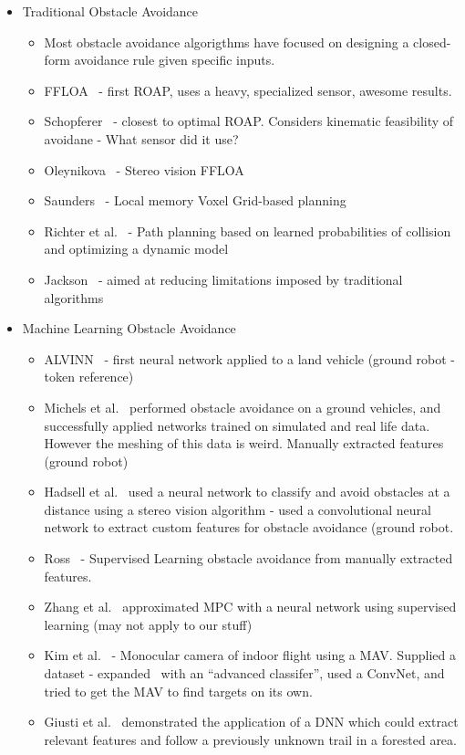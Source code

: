 \documentclass[paper=a4, fontsize=11pt]{scrartcl} %
\begin{document}
		\begin{itemize}
			\item Traditional Obstacle Avoidance
			\begin{itemize}
				\item Most obstacle avoidance algorigthms have focused on designing a closed-form avoidance rule given specific inputs.
				\item FFLOA~\cite{Scherer2007} - first ROAP, uses a heavy, specialized sensor, awesome results.
				\item Schopferer~\cite{Schopferer2014} - closest to optimal ROAP.  Considers kinematic feasibility of avoidane - What sensor did it use?
				\item Oleynikova~\cite{Oleynikova2015} - Stereo vision FFLOA
				\item Saunders~\cite{Saunders2009} - Local memory Voxel Grid-based planning
				\item Richter et al.~\cite{Richter2014} - Path planning based on learned probabilities of collision and optimizing a dynamic model
				\item Jackson~\cite{CEPA} - aimed at reducing limitations imposed by traditional algorithms
			\end{itemize}
			\item Machine Learning Obstacle Avoidance
			\begin{itemize}			
				\item ALVINN~\cite{Pomerleau1989} - first neural network applied to a land vehicle (ground robot - token reference)
				\item Michels et al.~\cite{Michels2005} performed obstacle avoidance on a ground vehicles, and successfully applied networks trained on simulated and real life data.  However the meshing of this data is weird.  Manually extracted features (ground robot)
				\item Hadsell et al.~\cite{Hadsell2009} used a neural network to classify and avoid obstacles at a distance using a stereo vision algorithm - used a convolutional neural network to extract custom features for obstacle avoidance (ground robot.
				\item Ross~\cite{Ross2013} - Supervised Learning obstacle avoidance from manually extracted features.
				\item Zhang et al.~\cite{Zhang2015} approximated MPC with a neural network using supervised learning (may not apply to our stuff)
				\item Kim et al.~\cite{Kim2015} - Monocular camera of indoor flight using a MAV.  Supplied a dataset - expanded~\cite{Ross2013} with an ``advanced classifer'', used a ConvNet, and tried to get the MAV to find targets on its own.
				\item Giusti et al.~\cite{Guisti2016} demonstrated the application of a DNN which could extract relevant features and follow a previously unknown trail in a forested area.
			\end{itemize}
		\end{itemize}
\end{document}
